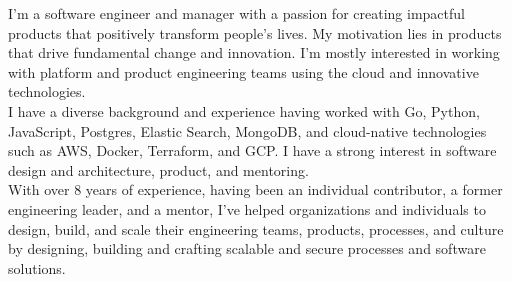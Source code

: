 \documentclass[9pt]{developercv} %
\begin{document}


\begin{minipage}[t]{1\textwidth} %
    {  
        I'm a software engineer and manager with a passion for creating impactful products 
        that positively transform people's lives. My motivation lies in products that drive fundamental 
        change and innovation. I'm mostly interested in working with platform and product engineering 
        teams using the cloud and innovative technologies. \\

        I have a diverse background and experience having worked with Go, Python, JavaScript, Postgres, 
        Elastic Search, MongoDB, and cloud-native technologies such as AWS, Docker, Terraform, and 
        GCP. I have a strong interest in software design and architecture, product, and mentoring. \\ 
    
        With over 8 years of experience, having been an individual contributor, a former engineering 
        leader, and a mentor, I've helped organizations and individuals to design, build, and scale 
        their engineering teams, products, processes, and culture by designing, building and crafting 
        scalable and secure processes and software solutions. 
    }
\end{minipage}



\end{document}
